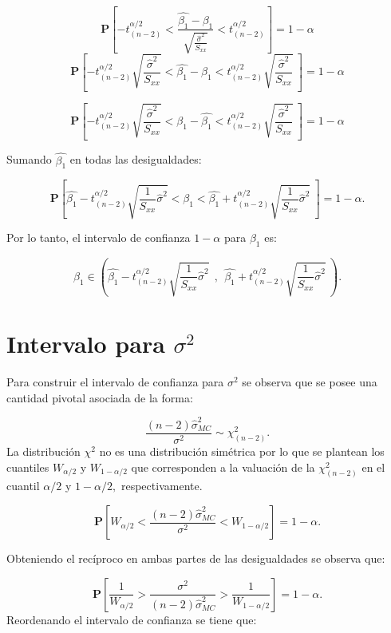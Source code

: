 \documentclass[
  a4paper,
  oneside,
  openany]{book}
\begin{document}
\[\mathbf{P}\left[-t^{\alpha/2}_{(n-2)} < \frac{\hat{\beta_{1}}-\beta_{1}}{\sqrt{\frac{\hat{\sigma}^2}{S_{xx}}}} < t^{\alpha/2}_{(n-2)}\right]=1-\alpha\]
\[\mathbf{P}\left[-t^{\alpha/2}_{(n-2)} \sqrt{\frac{\hat{\sigma}^2}{S_{xx}}} < \hat{\beta_{1}}-\beta_{1}< t^{\alpha/2}_{(n-2)} \sqrt{\frac{\hat{\sigma}^2}{S_{xx}}} \ \right]=1-\alpha\]

\[\mathbf{P}\left[-t^{\alpha/2}_{(n-2)} \sqrt{\frac{\hat{\sigma}^2}{S_{xx}}} < \beta_{1}-\hat{\beta_{1}}< t^{\alpha/2}_{(n-2)} \sqrt{\frac{\hat{\sigma}^2}{S_{xx}}} \ \right]=1-\alpha\]

Sumando \(\hat{\beta_{1}}\) en todas las desigualdades:

\[\mathbf{P}\left[\hat{\beta_{1}}-t^{\alpha/2}_{(n-2)} \sqrt{\frac{1}{S_{xx}}\hat{\sigma}^2} < \beta_{1}< \hat{\beta_{1}}+t^{\alpha/2}_{(n-2)} \sqrt{\frac{1}{S_{xx}}\hat{\sigma}^2} \ \right]=1-\alpha.\]

Por lo tanto, el intervalo de confianza \(1-\alpha\) para \(\beta_{1}\) es:

\[\beta_{1} \in \left( \hat{\beta_{1}}-t^{\alpha/2}_{(n-2)} \sqrt{\frac{1}{S_{xx}}\hat{\sigma}^2} \ \ , \ \ \hat{\beta_{1}}+t^{\alpha/2}_{(n-2)} \sqrt{\frac{1}{S_{xx}}\hat{\sigma}^2} \  \right).\]

\hypertarget{intervalo-para-sigma2}{%
\section{\texorpdfstring{Intervalo para \(\sigma^2\)}{Intervalo para \textbackslash sigma\^{}2}}\label{intervalo-para-sigma2}}

Para construir el intervalo de confianza para \(\sigma^2\) se observa que se posee una cantidad pivotal asociada de la forma:

\[\frac{(n-2)\hat{\sigma}^2_{MC}}{\sigma^2}\sim \chi^2_{(n-2)}.\]
La distribución \(\chi^2\) no es una distribución simétrica por lo que se plantean los cuantiles \(W_{\alpha/2}\) y \(W_{1-\alpha/2}\) que corresponden a la valuación de la \(\chi^2_{(n-2)}\) en el cuantil \(\alpha/2\) y \(1-\alpha/2,\) respectivamente.

\[\mathbf{P}\left[W_{\alpha/2}<\frac{(n-2)\hat{\sigma}^2_{MC}}{\sigma^2}< W_{1-\alpha/2}\right]=1-\alpha.\]

Obteniendo el recíproco en ambas partes de las desigualdades se observa que:

\[\mathbf{P}\left[\frac{1}{W_{\alpha/2}}>\frac{\sigma^2}{(n-2)\hat{\sigma}^2_{MC}}>\frac{1} {W_{1-\alpha/2}}\right]=1-\alpha.\]
Reordenando el intervalo de confianza se tiene que:
\end{document}
